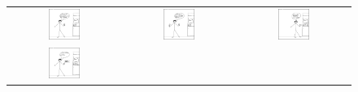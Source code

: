 \documentclass{article}
\begin{document}
\begin{figure}[H]
    \centering
    \begin{tabular}{ccc}
        \includegraphics[width=0.3\textwidth]{Storyboard/task2-img II versione/t2.1.png} &
        \includegraphics[width=0.3\textwidth]{Storyboard/task2-img II versione/t2.2.png} &
        \includegraphics[width=0.3\textwidth]{Storyboard/task2-img II versione/t2.3.png} \\
        \includegraphics[width=0.3\textwidth]{Storyboard/task2-img II versione/t2.4.png} & & \\
    \end{tabular}
    \label{fig:task2}
\end{figure}

\newpage
\end{document}
